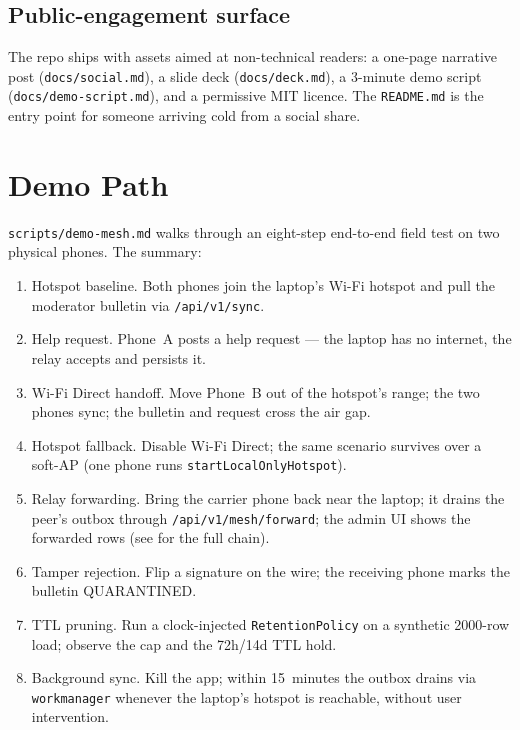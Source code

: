 \documentclass[11pt,a4paper]{article}
\begin{document}
\subsection{Public-engagement surface}
\label{sec:engagement}

The repo ships with assets aimed at non-technical readers:
a one-page narrative post (\texttt{docs/social.md}), a slide
deck (\texttt{docs/deck.md}), a 3-minute demo script
(\texttt{docs/demo-script.md}), and a permissive MIT licence.
The \texttt{README.md} is the entry point for someone
arriving cold from a social share.

\section{Demo Path}
\label{sec:demo}

\texttt{scripts/demo-mesh.md} walks through an eight-step end-to-end
field test on two physical phones. The summary:

\begin{enumerate}[leftmargin=*,label=\textbf{Step \arabic*.}]
  \item Hotspot baseline. Both phones join the laptop's Wi-Fi
        hotspot and pull the moderator bulletin via
        \texttt{/api/v1/sync}.
  \item Help request. Phone~A posts a help request --- the laptop
        has no internet, the relay accepts and persists it.
  \item Wi-Fi Direct handoff. Move Phone~B out of the hotspot's
        range; the two phones sync; the bulletin and request cross
        the air gap.
  \item Hotspot fallback. Disable Wi-Fi Direct; the same scenario
        survives over a soft-AP (one phone runs
        \texttt{startLocalOnlyHotspot}).
  \item Relay forwarding. Bring the carrier phone back near the
        laptop; it drains the peer's outbox through
        \texttt{/api/v1/mesh/forward}; the admin UI shows the
        forwarded rows (see  for the full
        chain).
  \item Tamper rejection. Flip a signature on the wire; the receiving
        phone marks the bulletin QUARANTINED.
  \item TTL pruning. Run a clock-injected
        \texttt{Retention}\allowbreak\texttt{Policy} on a synthetic 2000-row load;
        observe the cap and the 72h/14d TTL hold.
  \item Background sync. Kill the app; within 15~minutes the outbox
        drains via \texttt{workmanager} whenever the laptop's
        hotspot is reachable, without user intervention.
\end{enumerate}
\end{document}
